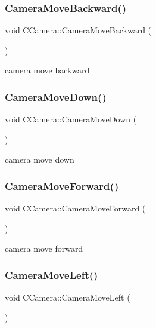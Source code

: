 \subsubsection{\texorpdfstring{CameraMoveBackward()}{CameraMoveBackward()}}
{\footnotesize\ttfamily void C\+Camera\+::\+Camera\+Move\+Backward (\begin{DoxyParamCaption}{ }\end{DoxyParamCaption})}



camera move backward 

\mbox{\label{class_c_camera_aa89809272db834f406ce4453b4399eef}} 
\subsubsection{\texorpdfstring{CameraMoveDown()}{CameraMoveDown()}}
{\footnotesize\ttfamily void C\+Camera\+::\+Camera\+Move\+Down (\begin{DoxyParamCaption}{ }\end{DoxyParamCaption})}



camera move down 

\mbox{\label{class_c_camera_a9446bfa84185f4924bc0e518dd3dd766}} 
\subsubsection{\texorpdfstring{CameraMoveForward()}{CameraMoveForward()}}
{\footnotesize\ttfamily void C\+Camera\+::\+Camera\+Move\+Forward (\begin{DoxyParamCaption}{ }\end{DoxyParamCaption})}



camera move forward 

\mbox{\label{class_c_camera_a7649ce213b5baaae9dcb0d17776e8606}} 
\subsubsection{\texorpdfstring{CameraMoveLeft()}{CameraMoveLeft()}}
{\footnotesize\ttfamily void C\+Camera\+::\+Camera\+Move\+Left (\begin{DoxyParamCaption}{ }\end{DoxyParamCaption})}



